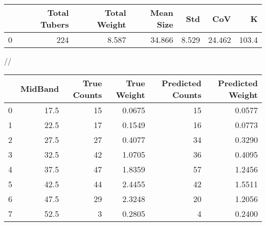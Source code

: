 \begin{tabular}{lrrrrrr}
\toprule
{} &  Total Tubers &  Total Weight &  Mean Size &    Std &     CoV &      K \\
\midrule
0 &           224 &         8.587 &     34.866 &  8.529 &  24.462 &  103.4 \\
\bottomrule
\end{tabular}
//\begin{tabular}{lrrrrr}
\toprule
{} &  MidBand &  True Counts &  True Weight &  Predicted Counts &  Predicted Weight \\
\midrule
0 &     17.5 &           15 &       0.0675 &                15 &            0.0577 \\
1 &     22.5 &           17 &       0.1549 &                16 &            0.0773 \\
2 &     27.5 &           27 &       0.4077 &                34 &            0.3290 \\
3 &     32.5 &           42 &       1.0705 &                36 &            0.4095 \\
4 &     37.5 &           47 &       1.8359 &                57 &            1.2456 \\
5 &     42.5 &           44 &       2.4455 &                42 &            1.5511 \\
6 &     47.5 &           29 &       2.3248 &                20 &            1.2056 \\
7 &     52.5 &            3 &       0.2805 &                 4 &            0.2400 \\
\bottomrule
\end{tabular}
